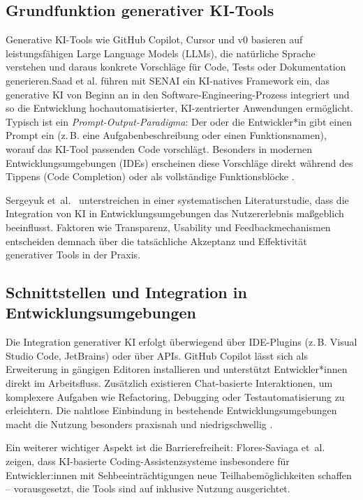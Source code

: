 \label{sec:generative-ki-tools}

\subsection{Grundfunktion generativer KI-Tools}

Generative KI-Tools wie GitHub Copilot, Cursor und v0 basieren auf
leistungsfähigen Large Language Models (LLMs), die natürliche Sprache verstehen
und daraus konkrete Vorschläge für Code, Tests oder Dokumentation
generieren.Saad et al. \cite{saad_senai_2025} führen mit SENAI ein KI-natives
Framework ein, das generative KI von Beginn an in den
Software-Engineering-Prozess integriert und so die Entwicklung
hochautomatisierter, KI-zentrierter Anwendungen ermöglicht. Typisch ist ein
\textit{Prompt-Output-Paradigma}: Der oder die Entwickler*in gibt einen Prompt
ein (z.\,B. eine Aufgabenbeschreibung oder einen Funktionsnamen), worauf das
KI-Tool passenden Code vorschlägt. Besonders in modernen Entwicklungsumgebungen
(IDEs) erscheinen diese Vorschläge direkt während des Tippens (Code Completion)
oder als vollständige Funktionsblöcke
\cite{kerr_github_nodate,weisz_design_2024}.

Sergeyuk et~al.~\cite{sergeyuk_human-ai_2025} unterstreichen in einer
systematischen Literaturstudie, dass die Integration von KI in
Entwicklungsumgebungen das Nutzererlebnis maßgeblich beeinflusst. Faktoren wie
Transparenz, Usability und Feedbackmechanismen entscheiden demnach über die
tatsächliche Akzeptanz und Effektivität generativer Tools in der Praxis.

\subsection{Schnittstellen und Integration in Entwicklungsumgebungen}

Die Integration generativer KI erfolgt überwiegend über IDE-Plugins (z.\,B.
Visual Studio Code, JetBrains) oder über APIs. GitHub Copilot lässt sich als
Erweiterung in gängigen Editoren installieren und unterstützt Entwickler*innen
direkt im Arbeitsfluss. Zusätzlich existieren Chat-basierte Interaktionen, um
komplexere Aufgaben wie Refactoring, Debugging oder Testautomatisierung zu
erleichtern. Die nahtlose Einbindung in bestehende Entwicklungsumgebungen macht
die Nutzung besonders praxisnah und niedrigschwellig
\cite{kerr_github_nodate,shi_ai-assisted_2023,weisz_design_2024}.

Ein weiterer wichtiger Aspekt ist die Barrierefreiheit: Flores-Saviaga
et~al.~\cite{flores-saviaga_impact_2025} zeigen, dass KI-basierte
Coding-Assistenzsysteme insbesondere für Entwickler:innen mit
Sehbeeinträchtigungen neue Teilhabemöglichkeiten schaffen -- vorausgesetzt, die
Tools sind auf inklusive Nutzung ausgerichtet.

